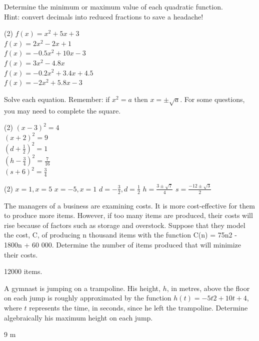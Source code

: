 \documentclass[12pt,fleqn]{book}
\newcommand{\prb}[1]{\begin{Exercise}#1\end{Exercise}}
\newcommand{\sol}[1]{\begin{Answer}#1\end{Answer}}
\begin{document}
\prb{Determine the minimum or maximum value of each quadratic function.  \\ Hint: convert decimals into reduced fractions to save a headache!
	\begin{tasks}(2)
		\task $f(x)=x^2+5 x+3$
		\\[10em]
		\task $f(x)=2 x^2-2 x+1$
		\\[10em]
		\task $f(x)=-0.5 x^2+10 x-3$
		\\[10em]
		\task $f(x)=3 x^2-4.8 x$
		\\[10em]
		\task $f(x)=-0.2 x^2+3.4 x+4.5$
		\\[10em]
		\task $f(x)=-2 x^2+5.8 x-3$
		\\[10em]
	\end{tasks}
}

\prb{Solve each equation.  Remember: if $x^2=a$ then $x=\pm \sqrt a$.  For some questions, you may need to complete the square.
	\begin{tasks}(2)
		\task $(x-3)^2=4$
		\\[5em]
		\task $(x+2)^2=9$
		\\[5em]
		\task $\left(d+\frac{1}{2}\right)^2=1$
		\\[5em]
		\task $\left(h-\frac{3}{4}\right)^2=\frac{7}{16}$
		\\[5em]
		\task $(s+6)^2=\frac{3}{4}$
		\\[5em]
	\end{tasks}
}
\sol{
	\begin{tasks}(2)
		\task $x=1, x=5$
		\task $x=-5, x=1$
		\task $d=-\frac{3}{2}, d=\frac{1}{2}$
		\task $h=\frac{3 \pm \sqrt{7}}{4}$
		\task $s=\frac{-12 \pm \sqrt{3}}{2}$
	\end{tasks}
}

\prb{The managers of a business are examining
	costs. It is more cost-effective for them
	to produce more items. However, if too
	many items are produced, their costs
	will rise because of factors such as
	storage and overstock. Suppose that
	they model the cost, C, of producing
	n thousand items with the function
	C(n) = 75n2 - 1800n + 60 000.
	Determine the number of items
	produced that will minimize their costs.\\[2in]}
\sol{12000 items.}

\prb{A gymnast is jumping on a trampoline.
	His height, $h$, in metres, above the floor
	on each jump is roughly approximated
	by the function $h(t) = -5t2 + 10t + 4$,
	where $t$ represents the time, in seconds,
	since he left the trampoline. Determine
	algebraically his maximum height on
	each jump.\\[2in]}
\sol{9 m}
\end{document}
